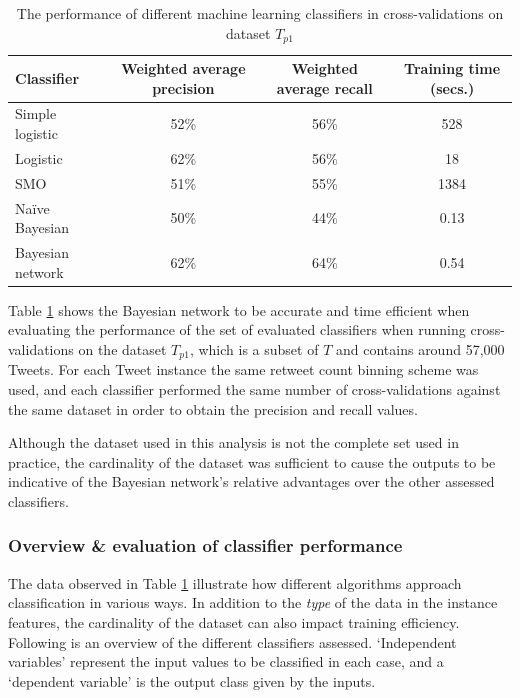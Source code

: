 \begin{table}[h]\footnotesize
\begin{center}
\begin{tabular}{ l | c | c | c }
	Classifier	& Weighted average precision & Weighted average recall &  Training time (secs.) \\
	\hline
	\hline 
	Simple logistic & 52\% &  56\% & 528\\
    Logistic        & 62\% &  56\% & 18\\
    SMO             & 51\% &  55\% & 1384\\
    Na\"{i}ve Bayesian & 50\% & 44\% & 0.13\\
    Bayesian network & 62\%&  64\% & 0.54\\
    \hline  
\end{tabular}
\end{center}
\caption{The performance of different machine learning classifiers in cross-validations on dataset $T_{p1}$}
\label{table:classifierperformance}
\end{table}

Table \ref{table:classifierperformance} shows the Bayesian network to be accurate and time efficient when evaluating the performance of the set of evaluated classifiers when running cross-validations on the dataset $T_{p1}$, which is a subset of $T$ and contains around 57,000 Tweets.  For each Tweet instance the same retweet count binning scheme was used, and each classifier performed the same number of cross-validations against the same dataset in order to obtain the precision and recall values.

Although the dataset used in this analysis is not the complete set used in practice, the cardinality of the dataset was sufficient to cause the outputs to be indicative of the Bayesian network's relative advantages over the other assessed classifiers.


\subsubsection{Overview \& evaluation of classifier performance}
The data observed in Table \ref{table:classifierperformance} illustrate how different algorithms approach classification in various ways. In addition to the \textit{type} of the data in the instance features, the cardinality of the dataset can also impact training efficiency. Following is an overview of the different classifiers assessed. `Independent variables' represent the input values to be classified in each case, and a `dependent variable' is the output class given by the inputs. 


